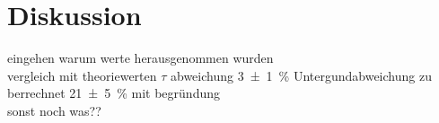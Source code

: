 
\section{Diskussion}
\label{sec:Diskussion}

eingehen warum werte herausgenommen wurden\\
vergleich mit theoriewerten $\tau$ abweichung \SI{3(1)}{\percent} Untergundabweichung zu berrechnet \SI{21(5)}{\percent}
mit begründung\\
sonst noch was??